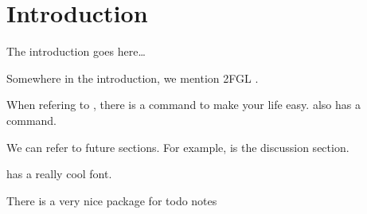 \section{Introduction}

The introduction goes here\ldots

Somewhere in the introduction, we mention 2FGL \citep{second_lat_catalog}.

When refering to \lat, there is a \lat command to make your life easy.
\fermi also has a command.

We can refer to future sections. For example,  is the discussion section.

\pointlike has a really cool font.

There is a very nice package for todo notes


